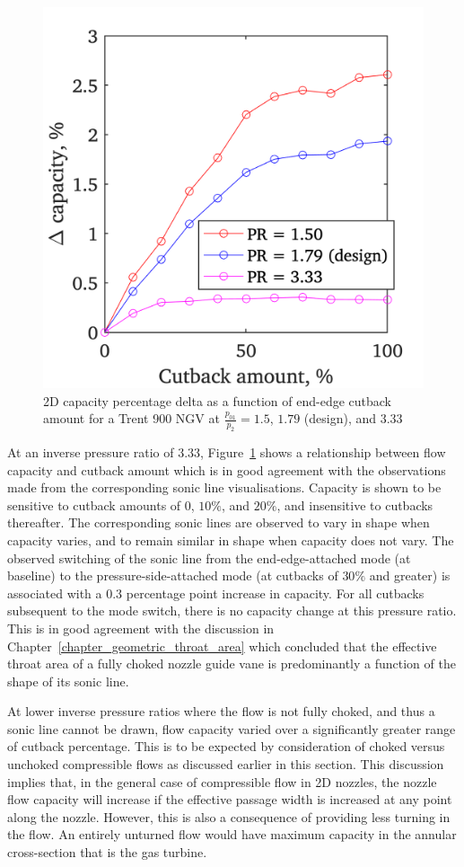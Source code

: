\documentclass[a4paper, 11pt, oneside]{report}
\begin{document}
\begin{figure}[H]
	\centering
	\includegraphics[width=.45\textwidth]{figs/ss_cutbacks_vs_capacities_pressure_ratios.png}
	\caption{2D capacity percentage delta as a function of end-edge cutback amount for a Trent 900 NGV at $\frac{p_{01}}{p_2}=1.5$, $1.79$ (design), and $3.33$}
    \label{fig:ss_cutbacks_vs_capacities_pressure_ratios}
\end{figure}

At an inverse pressure ratio of $3.33$, Figure~\ref{fig:ss_cutbacks_vs_capacities_pressure_ratios} shows a relationship between flow capacity and cutback amount which is in good agreement with the observations made from the corresponding sonic line visualisations. Capacity is shown to be sensitive to cutback amounts of $0$, $10\%$, and $20\%$, and insensitive to cutbacks thereafter. The corresponding sonic lines are observed to vary in shape when capacity varies, and to remain similar in shape when capacity does not vary. The observed switching of the sonic line from the end-edge-attached mode (at baseline) to the pressure-side-attached mode (at cutbacks of $30\%$ and greater) is associated with a $0.3$ percentage point increase in capacity. For all cutbacks subsequent to the mode switch, there is no capacity change at this pressure ratio. This is in good agreement with the discussion in Chapter~\ref{chapter_geometric_throat_area} which concluded that the effective throat area of a fully choked nozzle guide vane is predominantly a function of the shape of its sonic line.

At lower inverse pressure ratios where the flow is not fully choked, and thus a sonic line cannot be drawn, flow capacity varied over a significantly greater range of cutback percentage. This is to be expected by consideration of choked versus unchoked compressible flows as discussed earlier in this section. This discussion implies that, in the general case of compressible flow in 2D nozzles, the nozzle flow capacity will increase if the effective passage width is increased at any point along the nozzle. However, this is also a consequence of providing less turning in the flow. An entirely unturned flow would have maximum capacity in the annular cross-section that is the gas turbine. 
\end{document}
